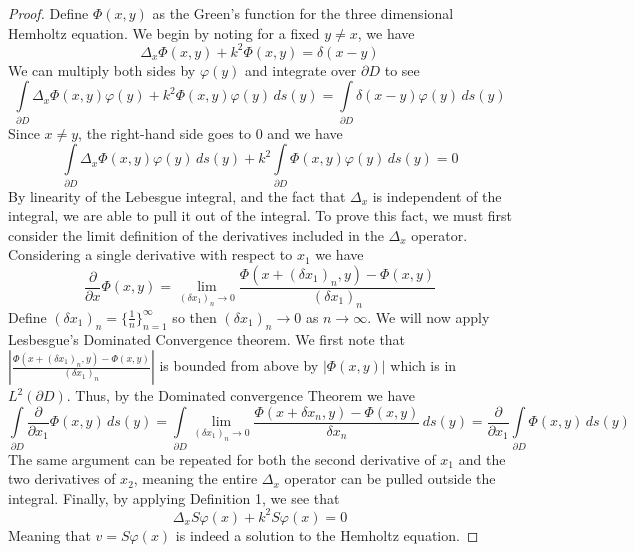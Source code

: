 \documentclass[]{article}
\begin{document}
			\begin{proof}
				Define $\Phi(x, y)$ as the Green's function for the three dimensional Hemholtz equation. We begin by noting for a fixed $y\neq x$, we have
				\begin{equation}
					\Delta_x \Phi(x, y) + k^2 \Phi(x, y) = \delta(x-y)
				\end{equation}
				We can multiply both sides by $\varphi(y)$ and integrate over $\partial D$ to see
				\begin{equation}
					\int\limits_{\partial D}\Delta_x \Phi(x, y)\varphi(y) + k^2 \Phi(x, y)\varphi(y)\, ds(y) = \int\limits_{\partial D}\delta(x-y)\varphi(y)\, ds(y)
				\end{equation}
				Since $x\neq y$, the right-hand side goes to 0 and we have
				\begin{equation}
					\int\limits_{\partial D}\Delta_x \Phi(x, y)\varphi(y)\, ds(y) + k^2\int\limits_{\partial D}\Phi(x, y)\varphi(y)\, ds(y) = 0
				\end{equation}
				By linearity of the Lebesgue integral, and the fact that $\Delta_x$ is independent of the integral, we are able to pull it out of the integral. To prove this fact, we must first consider the limit definition of the derivatives included in the $\Delta_x$ operator. Considering a single derivative with respect to $x_1$ we have
				\begin{equation}
					\frac{\partial }{\partial x}\Phi(x, y) = \lim_{(\delta x_1)_n \to 0}\frac{\Phi(x+ (\delta x_1)_n, y) - \Phi(x, y)}{(\delta x_1)_n}
				\end{equation}
				Define $(\delta x_1)_n = \{\frac{1}{n}\}^{\infty}_{n =1}$ so then $(\delta x_1)_n\to 0 $ as $n \to \infty$. We will now apply Lesbesgue's Dominated Convergence theorem. We first note that $ \left|\frac{\Phi(x+ (\delta x_1)_n, y) - \Phi(x, y)}{(\delta x_1)_n}\right|$ is bounded from above by $|\Phi(x, y)|$ which is in $L^2(\partial D)$. Thus, by the Dominated convergence Theorem we have
				\begin{equation}
					\int\limits_{\partial D}\frac{\partial }{\partial x_1}\Phi(x, y)\, ds(y) = \int\limits_{\partial D}\lim_{(\delta x_1)_n \to 0}\frac{\Phi(x+ \delta x_n, y) - \Phi(x, y)}{\delta x_n}\, ds(y) =  \frac{\partial }{\partial x_1}\int\limits_{\partial D}\Phi(x, y)\, ds(y)
				\end{equation}
				The same argument can be repeated for both the second derivative of $x_1$ and the two derivatives of $x_2$, meaning the entire $\Delta_x$ operator can be pulled outside the integral.
				Finally, by applying Definition 1, we see that
				\begin{equation}
					\Delta_xS\varphi(x)+ k^2S\varphi(x) = 0
				\end{equation}
				Meaning that $v = S\varphi(x)$ is indeed a solution to the Hemholtz equation.				
				

\end{proof}
\end{document}

